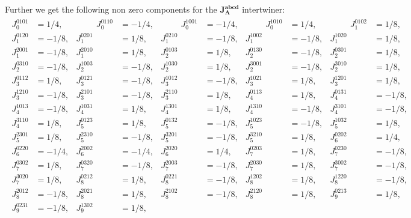 \documentclass[a4paper,12pt, DIV=14, BCOR=5mm, twoside, headsepline]{scrbook}
\begin{document}
Further we get the following non zero components for the $\boldsymbol{J_A^{abcd}}$ intertwiner:
\begin{align}\label{AreaJ}
    \begin{alignedat}{5}
    J_{0}^{0101} &= 1/4, & \hspace{1cm}
J_{0}^{0110} &= -1/4, & \hspace{1cm}
J_{0}^{1001} &= -1/4, & \hspace{1cm}
J_{0}^{1010} &= 1/4, & \hspace{1cm}
J_{1}^{0102} &= 1/8, \\ 
J_{1}^{0120} &= -1/8, & 
J_{1}^{0201} &= 1/8, & 
J_{1}^{0210} &= -1/8, & 
J_{1}^{1002} &= -1/8, & 
J_{1}^{1020} &= 1/8, \\ 
J_{1}^{2001} &= -1/8, & 
J_{1}^{2010} &= 1/8, & 
J_{2}^{0103} &= 1/8, & 
J_{2}^{0130} &= -1/8, & 
J_{2}^{0301} &= 1/8, \\ 
J_{2}^{0310} &= -1/8, & 
J_{2}^{1003} &= -1/8, & 
J_{2}^{1030} &= 1/8, & 
J_{2}^{3001} &= -1/8, & 
J_{2}^{3010} &= 1/8, \\ 
J_{3}^{0112} &= 1/8, & 
J_{3}^{0121} &= -1/8, & 
J_{3}^{1012} &= -1/8, & 
J_{3}^{1021} &= 1/8, & 
J_{3}^{1201} &= 1/8, \\ 
J_{3}^{1210} &= -1/8, & 
J_{3}^{2101} &= -1/8, & 
J_{3}^{2110} &= 1/8, & 
J_{4}^{0113} &= 1/8, & 
J_{4}^{0131} &= -1/8, \\ 
J_{4}^{1013} &= -1/8, & 
J_{4}^{1031} &= 1/8, & 
J_{4}^{1301} &= 1/8, & 
J_{4}^{1310} &= -1/8, & 
J_{4}^{3101} &= -1/8,  \\
J_{4}^{3110} &= 1/8, & 
J_{5}^{0123} &= 1/8, & 
J_{5}^{0132} &= -1/8, & 
J_{5}^{1023} &= -1/8, & 
J_{5}^{1032} &= 1/8, \\ 
J_{5}^{2301} &= 1/8, & 
J_{5}^{2310} &= -1/8, & 
J_{5}^{3201} &= -1/8, & 
J_{5}^{3210} &= 1/8, & 
J_{6}^{0202} &= 1/4, \\ 
J_{6}^{0220} &= -1/4, & 
J_{6}^{2002} &= -1/4, & 
J_{6}^{2020} &= 1/4, & 
J_{7}^{0203} &= 1/8, & 
J_{7}^{0230} &= -1/8, \\ 
J_{7}^{0302} &= 1/8, & 
J_{7}^{0320} &= -1/8, & 
J_{7}^{2003} &= -1/8, & 
J_{7}^{2030} &= 1/8, & 
J_{7}^{3002} &= -1/8, \\ 
J_{7}^{3020} &= 1/8, & 
J_{8}^{0212} &= 1/8, & 
J_{8}^{0221} &= -1/8, & 
J_{8}^{1202} &= 1/8, & 
J_{8}^{1220} &= -1/8, \\ 
J_{8}^{2012} &= -1/8, & 
J_{8}^{2021} &= 1/8, & 
J_{8}^{2102} &= -1/8, & 
J_{8}^{2120} &= 1/8, & 
J_{9}^{0213} &= 1/8, \\ 
J_{9}^{0231} &= -1/8, & 
J_{9}^{1302} &= 1/8, & 

\end{alignedat}
\end{align}
\end{document}
